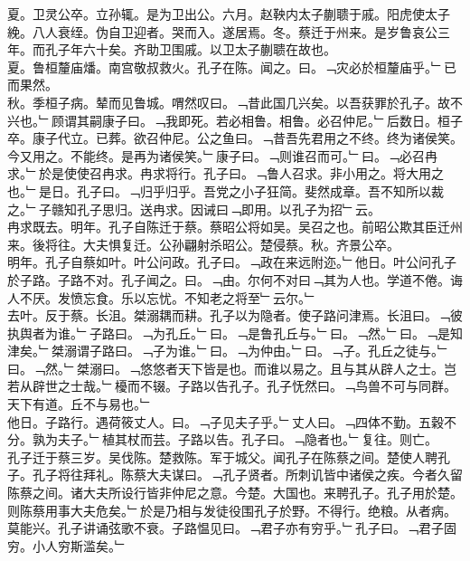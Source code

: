 \documentclass{zhvt-classic}
\begin{document}
\hspace*{2em}夏。卫灵公卒。立孙辄。是为卫出公。六月。赵鞅内太子蒯聩于戚。阳虎使太子絻。八人衰绖。伪自卫迎者。哭而入。遂居焉。冬。蔡迁于州来。是岁鲁哀公三年。而孔子年六十矣。齐助卫围戚。以卫太子蒯聩在故也。\\
\hspace*{2em}夏。鲁桓釐庙燔。南宫敬叔救火。孔子在陈。闻之。曰。﹁灾必於桓釐庙乎。﹂已而果然。\\
\hspace*{2em}秋。季桓子病。辇而见鲁城。喟然叹曰。﹁昔此国几兴矣。以吾获罪於孔子。故不兴也。﹂顾谓其嗣康子曰。﹁我即死。若必相鲁。相鲁。必召仲尼。﹂后数日。桓子卒。康子代立。已葬。欲召仲尼。公之鱼曰。﹁昔吾先君用之不终。终为诸侯笑。今又用之。不能终。是再为诸侯笑。﹂康子曰。﹁则谁召而可。﹂曰。﹁必召冉求。﹂於是使使召冉求。冉求将行。孔子曰。﹁鲁人召求。非小用之。将大用之也。﹂是日。孔子曰。﹁归乎归乎。吾党之小子狂简。斐然成章。吾不知所以裁之。﹂子赣知孔子思归。送冉求。因诫曰﹁即用。以孔子为招﹂云。\\
\hspace*{2em}冉求既去。明年。孔子自陈迁于蔡。蔡昭公将如吴。吴召之也。前昭公欺其臣迁州来。後将往。大夫惧复迁。公孙翩射杀昭公。楚侵蔡。秋。齐景公卒。\\
\hspace*{2em}明年。孔子自蔡如叶。叶公问政。孔子曰。﹁政在来远附迩。﹂他日。叶公问孔子於子路。子路不对。孔子闻之。曰。﹁由。尔何不对曰﹁其为人也。学道不倦。诲人不厌。发愤忘食。乐以忘忧。不知老之将至﹂云尔。﹂\\
\hspace*{2em}去叶。反于蔡。长沮。桀溺耦而耕。孔子以为隐者。使子路问津焉。长沮曰。﹁彼执舆者为谁。﹂子路曰。﹁为孔丘。﹂曰。﹁是鲁孔丘与。﹂曰。﹁然。﹂曰。﹁是知津矣。﹂桀溺谓子路曰。﹁子为谁。﹂曰。﹁为仲由。﹂曰。﹁子。孔丘之徒与。﹂曰。﹁然。﹂桀溺曰。﹁悠悠者天下皆是也。而谁以易之。且与其从辟人之士。岂若从辟世之士哉。﹂櫌而不辍。子路以告孔子。孔子怃然曰。﹁鸟兽不可与同群。天下有道。丘不与易也。﹂\\
\hspace*{2em}他日。子路行。遇荷筱丈人。曰。﹁子见夫子乎。﹂丈人曰。﹁四体不勤。五穀不分。孰为夫子。﹂植其杖而芸。子路以告。孔子曰。﹁隐者也。﹂复往。则亡。\\
\hspace*{2em}孔子迁于蔡三岁。吴伐陈。楚救陈。军于城父。闻孔子在陈蔡之间。楚使人聘孔子。孔子将往拜礼。陈蔡大夫谋曰。﹁孔子贤者。所刺讥皆中诸侯之疾。今者久留陈蔡之间。诸大夫所设行皆非仲尼之意。今楚。大国也。来聘孔子。孔子用於楚。则陈蔡用事大夫危矣。﹂於是乃相与发徒役围孔子於野。不得行。绝粮。从者病。莫能兴。孔子讲诵弦歌不衰。子路愠见曰。﹁君子亦有穷乎。﹂孔子曰。﹁君子固穷。小人穷斯滥矣。﹂\\
\end{document}
